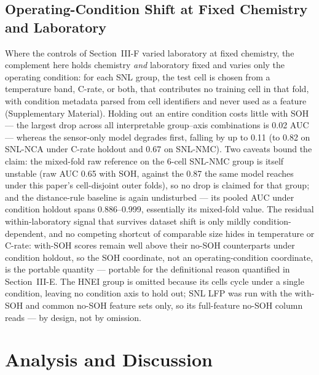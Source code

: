 \subsection{Operating-Condition Shift at Fixed Chemistry and Laboratory}
Where the controls of Section~III-F varied laboratory at fixed chemistry, the complement here holds chemistry \emph{and} laboratory fixed and varies only the operating condition: for each SNL group, the test cell is chosen from a temperature band, C-rate, or both, that contributes no training cell in that fold, with condition metadata parsed from cell identifiers and never used as a feature (Supplementary Material). Holding out an entire condition costs little with SOH --- the largest drop across all interpretable group--axis combinations is 0.02 AUC --- whereas the sensor-only model degrades first, falling by up to 0.11 (to 0.82 on SNL-NCA under C-rate holdout and 0.67 on SNL-NMC). Two caveats bound the claim: the mixed-fold raw reference on the 6-cell SNL-NMC group is itself unstable (raw AUC 0.65 with SOH, against the 0.87 the same model reaches under this paper's cell-disjoint outer folds), so no drop is claimed for that group; and the distance-rule baseline is again undisturbed --- its pooled AUC under condition holdout spans 0.886--0.999, essentially its mixed-fold value. The residual within-laboratory signal that survives dataset shift is only mildly condition-dependent, and no competing shortcut of comparable size hides in temperature or C-rate: with-SOH scores remain well above their no-SOH counterparts under condition holdout, so the SOH coordinate, not an operating-condition coordinate, is the portable quantity --- portable for the definitional reason quantified in Section~III-E. The HNEI group is omitted because its cells cycle under a single condition, leaving no condition axis to hold out; SNL LFP was run with the with-SOH and common no-SOH feature sets only, so its full-feature no-SOH column reads --- by design, not by omission.

\section{Analysis and Discussion}

